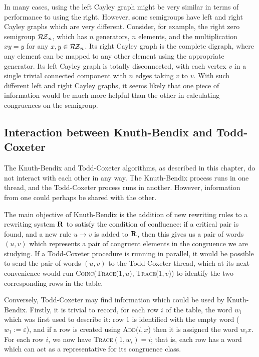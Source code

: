 In many cases, using the left Cayley graph might be very similar in terms of
performance to using the right.  However, some semigroups have left and right
Cayley graphs which are very different.  Consider, for example, the right zero
semigroup $\mathcal{R\!Z}_n$, which has $n$ generators, $n$ elements, and the
multiplication $xy=y$ for any $x,y \in \mathcal{R\!Z}_n$.  Its right Cayley graph is the
complete digraph, where any element can be mapped to any other element using the
appropriate generator.  Its left Cayley graph is totally disconnected, with each
vertex $v$ in a single trivial connected component with $n$ edges taking $v$ to
$v$.  With such different left and right Cayley graphs, it seems likely that one
piece of information would be much more helpful than the other in calculating
congruences on the semigroup.

\subsection{Interaction between Knuth-Bendix and Todd-Coxeter}
\label{sec:linking-kb-tc}
The Knuth-Bendix and Todd-Coxeter algorithms, as described in this chapter, do
not interact with each other in any way.  The Knuth-Bendix process runs in one
thread, and the Todd-Coxeter process runs in another.  However, information from
one could perhaps be shared with the other.

The main objective of Knuth-Bendix is the addition of new rewriting rules to a
rewriting system $\mathbf{R}$ to satisfy the condition of confluence: if a critical
pair is found, and a new rule $u \to v$ is added to $\mathbf{R}$, then this gives us a
pair of words $(u,v)$ which represents a pair of congruent elements in the congruence we
are studying.  If a Todd-Coxeter procedure is running in parallel, it would be
possible to send the pair of words $(u,v)$ to the Todd-Coxeter thread, which
at its next convenience would run \textsc{Coinc(Trace($1, u$), Trace($1, v$))}
to identify the two corresponding rows in the table.

Conversely, Todd-Coxeter may find information which could be used by
Knuth-Bendix.  Firstly, it is trivial to record, for each row $i$ of the table,
the word $w_i$ which was first used to describe it: row $1$ is identified with
the empty word ($w_1 := \varepsilon$), and if a row is created using
\textsc{Add($i, x$)} then it is assigned the word $w_ix$.  For each row $i$, we
now have \textsc{Trace}$(1, w_i) = i$; that is, each row has a word which can
act as a representative for its congruence class.

